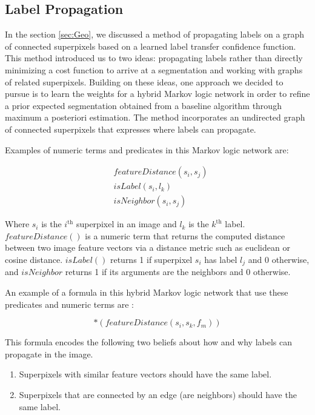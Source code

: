 \documentclass{article} %
\begin{document}
\subsection{Label Propagation}
\label{sec:AttemptLabProp}

	In the section \ref{sec:Geo}, we discussed a method of propagating labels on a graph of connected superpixels based on a learned label transfer confidence function. This method introduced us to two ideas: propagating labels rather than directly minimizing a cost function to arrive at a segmentation and working with graphs of related superpixels. Building on these ideas, one approach we decided to pursue is to learn the weights for a hybrid Markov logic network in order to refine a prior expected segmentation obtained from a baseline algorithm through maximum a posteriori estimation. The method incorporates an undirected graph of connected superpixels that expresses where labels can propagate.

Examples of numeric terms and predicates in this Markov logic network are:

\begin{align*}
	&featureDistance(s_i,s_j)\\
	&isLabel(s_i,l_k) \\
	&isNeighbor(s_i,s_j)
\end{align*}

Where $s_i$ is the $i^\textrm{th}$ superpixel in an image and $l_k$ is the $k^\textrm{th}$ label. $featureDistance()$ is a numeric term that returns the computed distance between two image feature vectors via a distance metric such as euclidean or cosine distance. $isLabel()$ returns 1 if superpixel $s_i$ has label $l_j$ and 0 otherwise, and $isNeighbor$ returns 1 if its arguments are the neighbors and 0 otherwise. 

An example of a formula in this hybrid Markov logic network that use these predicates and numeric terms are :

\begin{equation*}
	[isNeighbor(s_i,s_j) \Rightarrow (isLabel(s_i,l_k) \Leftrightarrow isLabel(s_k,l_m))]*(featureDistance(s_i, s_k, f_m))
\end{equation*}

This formula encodes the following two beliefs about how and why labels can propagate in the image.

\begin{enumerate}
\item
	Superpixels with similar feature vectors should have the same label.
\item
	Superpixels that are connected by an edge (are neighbors) should have the same label.
\end{enumerate}
\end{document}
